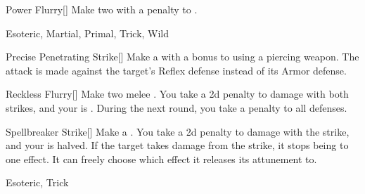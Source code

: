 \lowercase{\hypertarget{maneuver:Power Flurry}{}}\label{maneuver:Power Flurry}
\hypertarget{maneuver:Power Flurry}{}
\begin{freeability}[Rank 5]{Power Flurry}[]
Make two  with a  penalty to .


 Esoteric, Martial, Primal, Trick, Wild
\end{freeability}
\vspace{0.25em}



\lowercase{\hypertarget{maneuver:Precise Penetrating Strike}{}}\label{maneuver:Precise Penetrating Strike}
\hypertarget{maneuver:Precise Penetrating Strike}{}
\begin{freeability}[Rank 5]{Precise Penetrating Strike}[]
Make a  with a  bonus to  using a piercing weapon.
The attack is made against the target's Reflex defense instead of its Armor defense.


\end{freeability}
\vspace{0.25em}



\lowercase{\hypertarget{maneuver:Reckless Flurry}{}}\label{maneuver:Reckless Flurry}
\hypertarget{maneuver:Reckless Flurry}{}
\begin{freeability}[Rank 5]{Reckless Flurry}[]
Make two melee .
You take a \minus2d penalty to damage with both strikes, and your  is .
During the next round, you take a  penalty to all defenses.


\end{freeability}
\vspace{0.25em}



\lowercase{\hypertarget{maneuver:Spellbreaker Strike}{}}\label{maneuver:Spellbreaker Strike}
\hypertarget{maneuver:Spellbreaker Strike}{}
\begin{freeability}[Rank 5]{Spellbreaker Strike}[]
Make a .
You take a \minus2d penalty to damage with the strike, and your  is halved.
If the target takes damage from the strike, it stops being  to one effect.
It can freely choose which effect it releases its attunement to.


 Esoteric, Trick
\end{freeability}
\vspace{0.25em}



